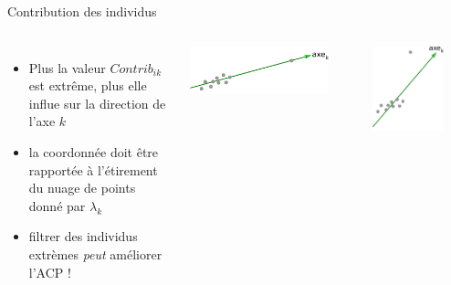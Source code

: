 \documentclass{beamer}
\begin{document}
\begin{frame}{Contribution des individus}

\vspace{1.5cm}



\begin{columns}[T,onlytextwidth]

\begin{itemize}

\item Plus la valeur $Contrib_{ik}$ est extrême, plus elle influe sur la direction de l'axe $k$
\item la coordonnée doit être rapportée à  l'étirement du nuage de points donné par  $\lambda_k$
\item filtrer des individus extrèmes \textit{peut} améliorer l'ACP ! 
\end{itemize}

\colorbox{white}{\includegraphics[width=0.85\textwidth,keepaspectratio]{img/contribution_indiv_axe.png}}

\vspace{0.5cm}

\colorbox{white}{\includegraphics[width=0.75\textwidth,keepaspectratio]{img/contribution_indiv_axe2.png}}

\end{columns}

\end{frame}
\end{document}
